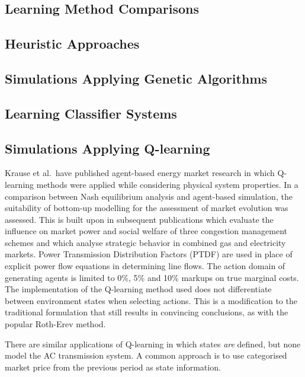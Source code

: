 \subsection{Learning Method Comparisons}
\subsection{Heuristic Approaches}
\subsection{Simulations Applying Genetic Algorithms}
\subsection{Learning Classifier Systems}

\subsection{Simulations Applying Q-learning}
Krause et al.\ have published agent-based energy market research in which
Q-learning methods were applied while considering physical system properties.
In a comparison between Nash equilibrium analysis and agent-based simulation,
the suitability of bottom-up modelling for the assessment of market evolution
was assessed\cite{krause:nash}.  This is built upon in subsequent publications
which evaluate the influence on market power and social welfare of three
congestion management schemes and which analyse strategic behavior in combined
gas and electricity markets\cite{krause:cong,krause:gas}.  Power Transmission
Distribution Factors (PTDF) are used in place of explicit power flow equations
in determining line flows.  The action domain of generating agents is limited
to 0\%, 5\% and 10\% markups on true marginal costs.  The implementation of the
Q-learning method used does not differentiate between environment states when
selecting actions. This is a modification to the traditional formulation that
still results in convincing conclusions, as with the popular Roth-Erev method.

There are similar applications of Q-learning in which states \textit{are}
defined, but none model the AC transmission system.  A common approach is to
use categorised market price from the previous period as state
information\cite{bakirtzis:psce,xiong:discrim}.

